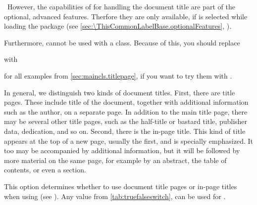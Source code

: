 %
\IfThisCommonLabelBase{scrextend}{\iftrue}{\csname iffalse\endcsname}%
  \ However, the capabilities of 
  for handling the document title are part of the optional, advanced
  features. Therfore they are only available, if
   is
  selected while loading the package (see
  \autoref{sec:\ThisCommonLabelBase.optionalFeatures},
  ).

  Furthermore,  cannot be used with a \KOMAScript{}
  class. Because of this, you should replace
  with
  for all examples from \autoref{sec:maincls.titlepage}, if you want to
  try them with .
\fi

In general, we distinguish two kinds of document titles. First, there are
title pages. These include title of the document, together with additional
information such as the author, on a separate page. In addition to the main
title page, there may be several other title pages, such as the half-title or
bastard title, publisher data, dedication, and so on. Second, there is the
in-page title. This kind of title appears at the top of a new page, usually
the first, and is specially emphasized. It too may be accompanied by
additional information, but it will be followed by more material on the same
page, for example by an abstract, the table of contents, or even a section.


\begin{Declaration}
\end{Declaration}%
This option determines whether to use document title pages or
in-page titles when using
 (see
). Any value from
\autoref{tab:truefalseswitch},  can be used
for .

